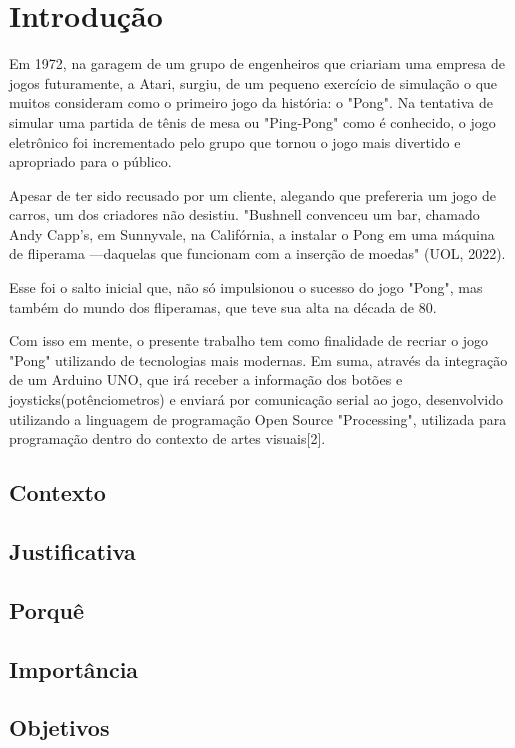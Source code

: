 \documentclass[conference]{IEEEtran}
\begin{document}
\section{Introdução}
	Em 1972, na garagem de um grupo de engenheiros que criariam uma empresa de jogos futuramente, a Atari, surgiu, de um pequeno exercício de simulação o que muitos consideram como o primeiro jogo da história: o "Pong". Na tentativa de simular uma partida de tênis de mesa ou "Ping-Pong" como é conhecido, o jogo eletrônico foi incrementado pelo grupo que tornou o jogo mais divertido e apropriado para o público.

	Apesar de ter sido recusado por um cliente, alegando que prefereria um jogo de carros, um dos criadores não desistiu. "Bushnell convenceu um bar, chamado Andy Capp's, em Sunnyvale, na Califórnia, a instalar o Pong em uma máquina de fliperama —daquelas que funcionam com a inserção de moedas" (UOL, 2022). 

	Esse foi o salto inicial que, não só impulsionou o sucesso do jogo "Pong", mas também do mundo dos fliperamas, que teve sua alta na década de 80.

	Com isso em mente, o presente trabalho tem como finalidade de recriar o jogo "Pong" utilizando de tecnologias mais modernas. Em suma, através da integração de um Arduino UNO, que irá receber a informação dos botões e joysticks(potênciometros) e enviará por comunicação serial ao jogo, desenvolvido utilizando a linguagem de programação Open Source "Processing", utilizada para programação dentro do contexto de artes visuais[2].


\subsection{Contexto}

\subsection{Justificativa}

\subsection{Porquê}

\subsection{Importância}

\subsection{Objetivos}
\end{document}
